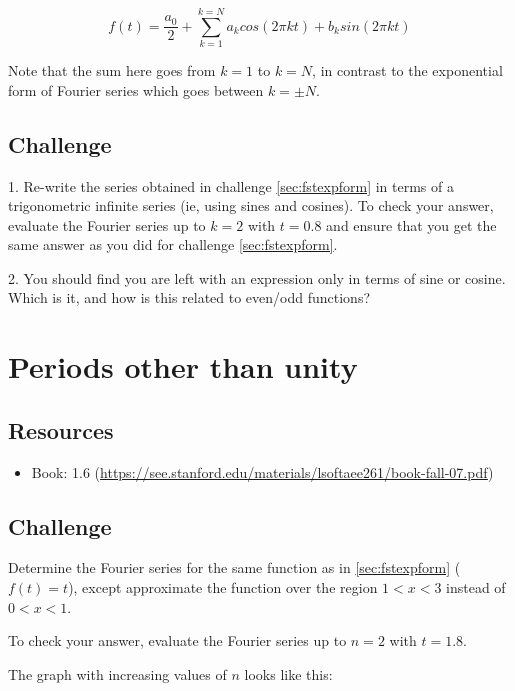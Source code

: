 \begin{equation}
    f(t) = \frac{a_0}{2} + \sum_{k=1}^{k=N} a_k cos(2 \pi k t) + b_k sin(2 \pi k t)
\end{equation}

Note that the sum here goes from $k=1$ to $k=N$, in contrast to the exponential form of Fourier series which goes between $k=\pm N$.

\subsection*{Challenge}
1. Re-write the series obtained in challenge \ref{sec:fstexpform} in terms of a trigonometric infinite series (ie, using sines and cosines). To check your answer, evaluate the Fourier series up to $k=2$ with $t=0.8$ and ensure that you get the same answer as you did for challenge \ref{sec:fstexpform}.

2. You should find you are left with an expression only in terms of sine or cosine. Which is it, and how is this related to even/odd functions?



\timebox




\newpage
\section{Periods other than unity}

\subsection*{Resources}
\begin{itemize}
    \item Book: 1.6 (\url{https://see.stanford.edu/materials/lsoftaee261/book-fall-07.pdf})
\end{itemize}

\subsection*{Challenge}
Determine the Fourier series for the same function as in \ref{sec:fstexpform} ($f(t)=t$), except approximate the function over the region $1<x<3$ instead of $0<x<1$.

To check your answer, evaluate the Fourier series up to $n=2$ with $t=1.8$.

The graph with increasing values of $n$ looks like this:

